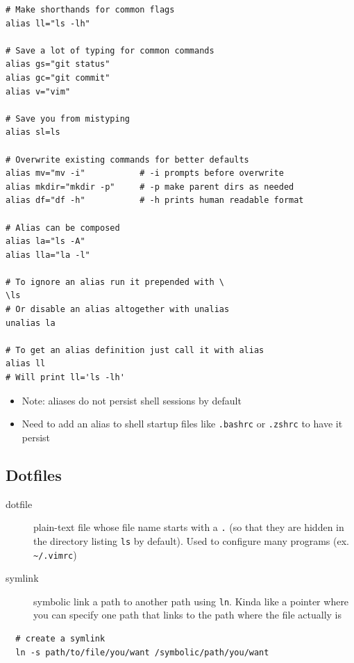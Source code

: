 \documentclass[letterpaper,12pt]{article}
\begin{document}
\begin{lstlisting}
# Make shorthands for common flags
alias ll="ls -lh"

# Save a lot of typing for common commands
alias gs="git status"
alias gc="git commit"
alias v="vim"

# Save you from mistyping
alias sl=ls

# Overwrite existing commands for better defaults
alias mv="mv -i"           # -i prompts before overwrite
alias mkdir="mkdir -p"     # -p make parent dirs as needed
alias df="df -h"           # -h prints human readable format

# Alias can be composed
alias la="ls -A"
alias lla="la -l"

# To ignore an alias run it prepended with \
\ls
# Or disable an alias altogether with unalias
unalias la

# To get an alias definition just call it with alias
alias ll
# Will print ll='ls -lh'
\end{lstlisting}

\begin{itemize}
  \item Note: aliases do not persist shell sessions by default
  \item Need to add an alias to shell startup files like \lstinline{.bashrc} or \lstinline{.zshrc} to have it persist
\end{itemize}

\subsection{Dotfiles}

\begin{description}
  \item[dotfile] plain-text file whose file name starts with a \lstinline{.} (so that they are hidden in the directory listing \lstinline{ls} by default). Used to configure many programs (ex. \lstinline{~/.vimrc})
  \item[symlink] symbolic link a path to another path using \lstinline{ln}. Kinda like a pointer where you can specify one path that links to the path where the file actually is
\end{description}

\begin{lstlisting}
  # create a symlink
  ln -s path/to/file/you/want /symbolic/path/you/want
\end{lstlisting}
\end{document}
